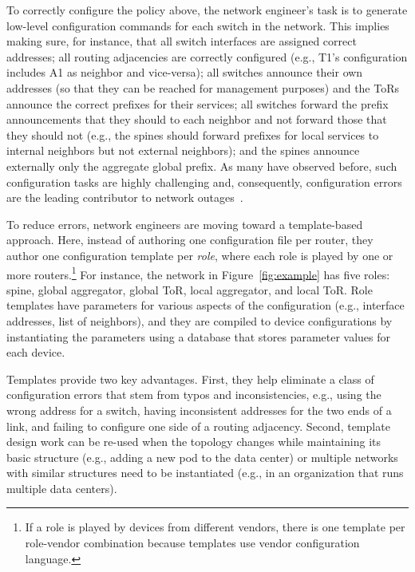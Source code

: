 \documentclass{sig-alternate-10pt}
\begin{document}
To correctly configure the policy above, the network engineer's task is to generate low-level configuration commands for each switch in the network. This implies making sure, for instance, that all switch interfaces are assigned correct addresses; all routing adjacencies are correctly configured (e.g., T1's configuration includes A1 as neighbor and vice-versa); all switches announce their own addresses (so that they can be reached for management purposes) and the ToRs announce the correct prefixes for their services; all switches  forward the prefix announcements that they should to each neighbor and not forward those that they should not (e.g., the spines should forward prefixes for local services to internal neighbors but not external neighbors); and the spines announce externally only the aggregate global prefix. As many have observed before, such configuration tasks are highly challenging and, consequently, configuration errors are the leading contributor to network outages~\cite{x,y,z,batfish,propane}. 

To reduce errors, network engineers are moving toward a template-based approach. Here, instead of authoring one configuration file per router, they author one configuration template per {\em role}, where each role is played by one or more routers.\footnote{If a role is played by devices from different vendors, there is one template per role-vendor combination because templates use vendor configuration language.} For instance, the network in Figure~\ref{fig:example} has five roles: spine, global aggregator, global ToR, local aggregator, and local ToR. Role templates have parameters for various aspects of the configuration (e.g., interface addresses, list of neighbors), and they are compiled to device configurations by instantiating the parameters using a database that stores parameter values for each device.

Templates provide two key advantages. First, they help eliminate a class of configuration errors that stem from typos and inconsistencies, e.g., using the wrong address for a switch, having inconsistent addresses for the two ends of a link, and failing to configure one side of a routing adjacency.  Second, template design work can be re-used when the topology changes while maintaining its basic structure (e.g., adding a new pod to the data center) or multiple networks with similar structures need to be instantiated (e.g., in an organization that runs multiple data centers).

\end{document}
